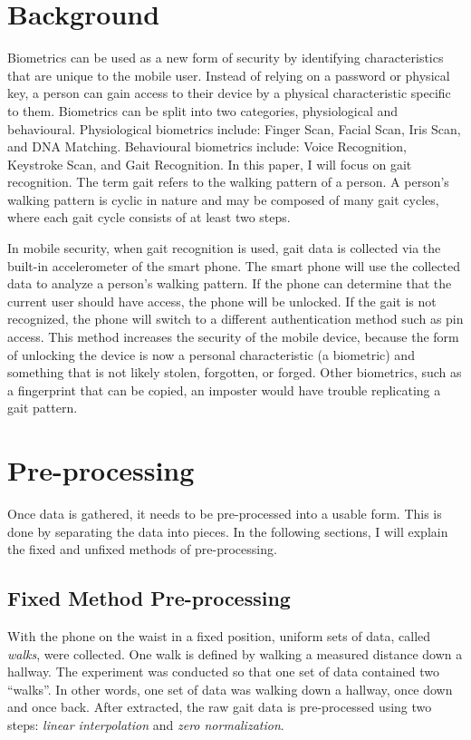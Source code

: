 \documentclass{sig-alternate}
\begin{document}
\section{Background}
	Biometrics can be used as a new form of security by identifying characteristics that are unique to the mobile user. Instead of relying on a password or physical key, a person can gain access to their device by a physical characteristic specific to them. Biometrics can be split into two categories, physiological and behavioural. Physiological biometrics include: Finger Scan, Facial Scan, Iris Scan, and DNA Matching. Behavioural biometrics include: Voice Recognition, Keystroke Scan, and Gait Recognition. In this paper, I will focus on gait recognition. The term gait refers to the walking pattern of a person. A person's walking pattern is cyclic in nature and may be composed of many gait cycles, where each gait cycle consists of at least two steps.~\cite{Sujithra:2012} 
	
	In mobile security, when gait recognition is used, gait data is collected via the built-in accelerometer of the smart phone. The smart phone will use the collected data to analyze a person's walking pattern. If the phone can determine that the current user should have access, the phone will be unlocked. If the gait is not recognized, the phone will switch to a different authentication method such as pin access. This method increases the security of the mobile device, because the form of unlocking the device is now a personal characteristic (a biometric) and something that is not likely stolen, forgotten, or forged. Other biometrics, such as a fingerprint that can be copied, an imposter would have trouble replicating a gait pattern.


\section{Pre-processing} 
	Once data is gathered, it needs to be pre-processed into a usable form. This is done by separating the data into pieces. In the following sections, I will explain the fixed and unfixed methods of pre-processing.

    
\subsection{Fixed Method Pre-processing}	\label{FPP}
	With the phone on the waist in a fixed position, uniform sets of data, called \textit{walks}, were collected. One walk is defined by walking a measured distance down a hallway. The experiment was conducted so that one set of data contained two ``walks''. In other words, one set of data was walking down a hallway, once down and once back. After extracted, the raw gait data is pre-processed using two steps: \textit{linear interpolation} and \textit{zero normalization}. 
			
\end{document}
